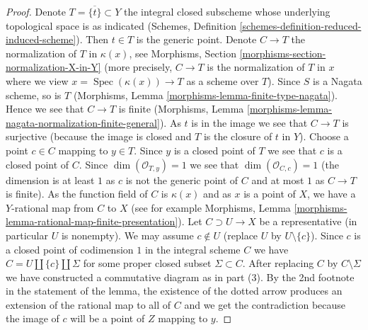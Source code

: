 \documentclass{stacks-project}
\theoremstyle{plain}
\theoremstyle{definition}
\theoremstyle{remark}
\numberwithin{equation}{subsection}
\def\Spec{\mathop{\mathrm{Spec}}}
\begin{document}
\begin{proof}
\medskip\noindent
Denote $T = \overline{\{t\}} \subset Y$ the integral closed subscheme
whose underlying topological space is as indicated
(Schemes, Definition \ref{schemes-definition-reduced-induced-scheme}).
Then $t \in T$ is the generic point.
Denote $C \to T$ the normalization of $T$ in $\kappa(x)$, see
Morphisms, Section \ref{morphisms-section-normalization-X-in-Y}
(more precisely, $C \to T$ is the normalization of $T$ in $x$
where we view $x = \Spec(\kappa(x)) \to T$ as a scheme over $T$).
Since $S$ is a Nagata scheme, so is $T$
(Morphisms, Lemma \ref{morphisms-lemma-finite-type-nagata}).
Hence we see that $C \to T$ is finite
(Morphisms, Lemma \ref{morphisms-lemma-nagata-normalization-finite-general}).
As $t$ is in the image we see that $C \to T$ is surjective (because
the image is closed and $T$ is the closure of $t$ in $Y$).
Choose a point $c \in C$ mapping to $y \in T$.
Since $y$ is a closed point of $T$ we see that $c$ is
a closed point of $C$. Since $\dim(\mathcal{O}_{T, y}) = 1$
we see that $\dim(\mathcal{O}_{C, c}) = 1$ (the dimension is
at least $1$ as $c$ is not the generic point of $C$ and
at most $1$ as $C \to T$ is finite).
As the function field of $C$ is $\kappa(x)$ and as $x$
is a point of $X$, we have a $Y$-rational map from $C$ to $X$
(see for example Morphisms, Lemma
\ref{morphisms-lemma-rational-map-finite-presentation}).
Let $C \supset U \to X$ be a representative (in particular $U$ is nonempty).
We may assume $c \not \in U$ (replace $U$ by $U \setminus \{c\}$).
Since $c$ is a closed point of codimension $1$ in the integral scheme $C$
we have $C = U \amalg \{c\} \amalg \Sigma$
for some proper closed subset $\Sigma \subset C$.
After replacing $C$ by $C \setminus \Sigma$
we have constructed a commutative diagram as in part (3).
By the 2nd footnote in the statement of the lemma,
the existence of the dotted arrow produces an extension
of the rational map to all of $C$ and we get the contradiction
because the image of $c$ will be a point of $Z$ mapping to $y$.
\end{proof}
\end{document}
